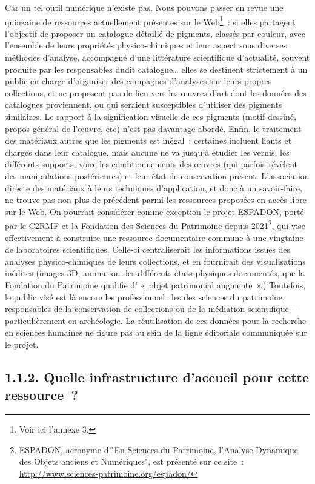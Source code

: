 \documentclass[a4paper,12pt, twoside]{book}
\begin{document}
Car un tel outil numérique n’existe pas. Nous pouvons passer en revue une quinzaine de ressources actuellement présentes sur le Web\footnote{Voir ici l’annexe 3.}~: si elles partagent l’objectif de proposer un catalogue détaillé de pigments, classés par couleur, avec l’ensemble de leurs propriétés physico-chimiques et leur aspect sous diverses méthodes d’analyse, accompagné d’une littérature scientifique d’actualité, souvent produite par les responsables dudit catalogue… elles se destinent strictement à un public en charge d’organiser des campagnes d’analyses sur leurs propres collections, et ne proposent pas de lien vers les œuvres d’art dont les données des catalogues proviennent, ou qui seraient susceptibles d’utiliser des pigments similaires. Le rapport à la signification visuelle de ces pigments (motif dessiné, propos général de l’œuvre, etc) n’est pas davantage abordé. Enfin, le traitement des matériaux autres que les pigments est inégal~: certaines incluent liants et charges dans leur catalogue, mais aucune ne va jusqu’à étudier les vernis, les différents supports, voire les conditionnements des œuvres (qui parfois révèlent des manipulations postérieures) et leur état de conservation présent. L’association directe des matériaux à leurs techniques d’application, et donc à un savoir-faire, ne trouve pas non plus de précédent parmi les ressources proposées en accès libre sur le Web. On pourrait considérer comme exception le projet ESPADON, porté par le C2RMF et la Fondation des Sciences du Patrimoine depuis 2021\footnote{ESPADON, acronyme d’"En Sciences du Patrimoine, l’Analyse Dynamique des Objets anciens et Numériques", est présenté sur ce site~: \url{http://www.sciences-patrimoine.org/espadon/}}, qui vise effectivement à construire une ressource documentaire commune à une vingtaine de laboratoires scientifiques. Celle-ci centraliserait les informations issues des analyses physico-chimiques de leurs collections, et en fournirait des visualisations inédites (images 3D, animation des différents états physiques documentés, que la Fondation du Patrimoine qualifie d’ «~objet patrimonial augmenté~».) Toutefois, le public visé est là encore les professionnel·les des sciences du patrimoine, responsables de la conservation de collections ou de la médiation scientifique – particulièrement en archéologie. La réutilisation de ces données pour la recherche en sciences humaines ne figure pas au sein de la ligne éditoriale communiquée sur le projet.

\subsection*{1.1.2. Quelle infrastructure d’accueil pour cette ressource~?}
\end{document}
